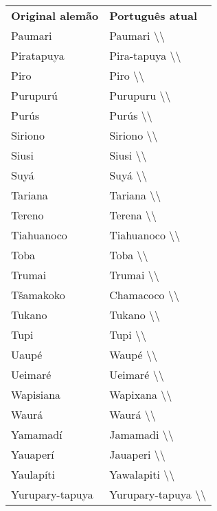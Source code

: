 \begin{table}[]
\begin{tabular}{|l|l|}
\textbf{Original alemão} & \textbf{Português atual}                            \\
Paumari                  & Paumari \textbackslash{}\textbackslash{}         \\
Piratapuya               & Pira-tapuya \textbackslash{}\textbackslash{}     \\
Piro                     & Piro \textbackslash{}\textbackslash{}            \\
Purupurú                 & Purupuru \textbackslash{}\textbackslash{}        \\
Purús                    & Purús \textbackslash{}\textbackslash{}           \\
Siriono                  & Siriono \textbackslash{}\textbackslash{}         \\
Siusi                    & Siusi \textbackslash{}\textbackslash{}           \\
Suyá                     & Suyá \textbackslash{}\textbackslash{}            \\
Tariana                  & Tariana \textbackslash{}\textbackslash{}         \\
Tereno                   & Terena \textbackslash{}\textbackslash{}          \\
Tiahuanoco               & Tiahuanoco \textbackslash{}\textbackslash{}      \\
Toba                     & Toba \textbackslash{}\textbackslash{}            \\
Trumai                   & Trumai \textbackslash{}\textbackslash{}          \\
Tšamakoko                & Chamacoco \textbackslash{}\textbackslash{}       \\
Tukano                   & Tukano \textbackslash{}\textbackslash{}          \\
Tupi                     & Tupi \textbackslash{}\textbackslash{}            \\
Uaupé                    & Waupé \textbackslash{}\textbackslash{}           \\
Ueimaré                  & Ueimaré \textbackslash{}\textbackslash{}         \\
Wapisiana                & Wapixana \textbackslash{}\textbackslash{}        \\
Waurá                    & Waurá \textbackslash{}\textbackslash{}           \\
Yamamadí                 & Jamamadi \textbackslash{}\textbackslash{}        \\
Yauaperí                 & Jauaperi \textbackslash{}\textbackslash{}        \\
Yaulapíti                & Yawalapiti \textbackslash{}\textbackslash{}      \\
Yurupary-tapuya          & Yurupary-tapuya \textbackslash{}\textbackslash{}
\end{tabular}
\end{table}